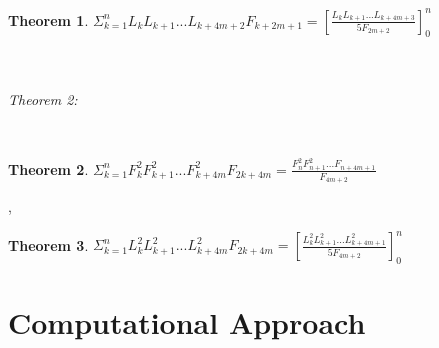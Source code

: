 \documentclass[11pt]{article}
\newtheorem{theorem}{Theorem}
\begin{document}
\begin{theorem}
$\Sigma_{k=1}^{n} L_{k}L_{k+1}...L_{k+4m+2}F_{k+2m+1}=[\frac{L_{k}L_{k+1}...L_{k+4m+3}}{5F_{2m+2}}]_{0}^n$
\end{theorem}\\ \\

\textit{Theorem 2:}

\\\begin{theorem}
$\Sigma_{k=1}^n F_{k}^2F_{k+1}^2...F_{k+4m}^2F_{2k+4m}=\frac{F_{n}^2F_{n+1}^2...F_{n+4m+1}}{F_{4m+2}}$
\end{theorem},\\

\begin{theorem}
$\Sigma_{k=1}^n L_{k}^2L_{k+1}^2...L_{k+4m}^2F_{2k+4m}=[\frac{L_{k}^2L_{k+1}^2...L_{k+4m+1}^2}{5F_{4m+2}}]_{0}^n$
\end{theorem}



\section{Computational Approach}
\end{document}
